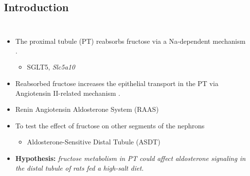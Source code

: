 \documentclass[
11pt,notheorems,hyperref={pdfauthor=whatever}
]{beamer}
\begin{document}
\subsection{Introduction}
\begin{frame}
    \begin{columns}[T,onlytextwidth]
          \begin{itemize}
            \item The proximal tubule (PT) reabsorbs fructose via a Na-dependent mechanism \cite{gonzalez2019sglt5}.
            \begin{itemize}
                \item SGLT5, \textit{Slc5a10}
            \end{itemize}
            \item Reabsorbed fructose increases the epithelial transport in the PT via Angiotensin II-related mechanism \cite{gonzalez2017angii}.
            \item Renin Angiotensin Aldosterone System (RAAS)
            \item To test the effect of fructose on other segments of the nephrons
            \begin{itemize}
                \item Aldosterone-Sensitive Distal Tubule (ASDT) 
            \end{itemize}
            \item \textbf{Hypothesis:} \textit{fructose metabolism in PT could affect aldosterone signaling in the distal tubule of rats fed a high-salt diet.}
          \end{itemize}


\end{columns}
\end{frame}
\end{document}

